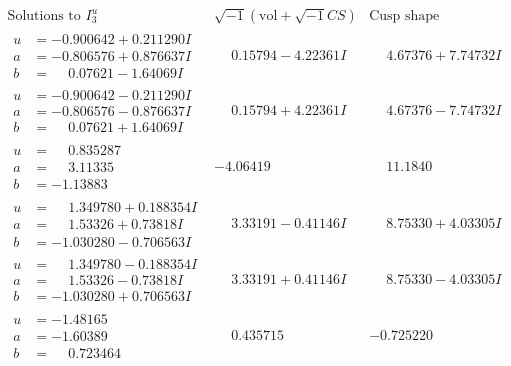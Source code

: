 \documentclass[1p]{elsarticle_modified}
\theoremstyle{definition}
\newcommand{\I}{\sqrt{-1}}
\begin{document}
$$\begin{array}{c|c|c}  
\text{Solutions to }I^u_{3}& \I (\text{vol} + \sqrt{-1}CS) & \text{Cusp shape}\\
 \hline 
\begin{aligned}
u &= -0.900642 + 0.211290 I \\
a &= -0.806576 + 0.876637 I \\
b &= \phantom{-}0.07621 - 1.64069 I\end{aligned}
 & \phantom{-}0.15794 - 4.22361 I & \phantom{-}4.67376 + 7.74732 I \\ \hline\begin{aligned}
u &= -0.900642 - 0.211290 I \\
a &= -0.806576 - 0.876637 I \\
b &= \phantom{-}0.07621 + 1.64069 I\end{aligned}
 & \phantom{-}0.15794 + 4.22361 I & \phantom{-}4.67376 - 7.74732 I \\ \hline\begin{aligned}
u &= \phantom{-}0.835287\phantom{ +0.000000I} \\
a &= \phantom{-}3.11335\phantom{ +0.000000I} \\
b &= -1.13883\phantom{ +0.000000I}\end{aligned}
 & -4.06419\phantom{ +0.000000I} & \phantom{-}11.1840\phantom{ +0.000000I} \\ \hline\begin{aligned}
u &= \phantom{-}1.349780 + 0.188354 I \\
a &= \phantom{-}1.53326 + 0.73818 I \\
b &= -1.030280 - 0.706563 I\end{aligned}
 & \phantom{-}3.33191 - 0.41146 I & \phantom{-}8.75330 + 4.03305 I \\ \hline\begin{aligned}
u &= \phantom{-}1.349780 - 0.188354 I \\
a &= \phantom{-}1.53326 - 0.73818 I \\
b &= -1.030280 + 0.706563 I\end{aligned}
 & \phantom{-}3.33191 + 0.41146 I & \phantom{-}8.75330 - 4.03305 I \\ \hline\begin{aligned}
u &= -1.48165\phantom{ +0.000000I} \\
a &= -1.60389\phantom{ +0.000000I} \\
b &= \phantom{-}0.723464\phantom{ +0.000000I}\end{aligned}
 & \phantom{-}0.435715\phantom{ +0.000000I} & -0.725220\phantom{ +0.000000I} \\ \hline\begin{aligned}

\end{aligned}
\end{array}$$
\end{document}
